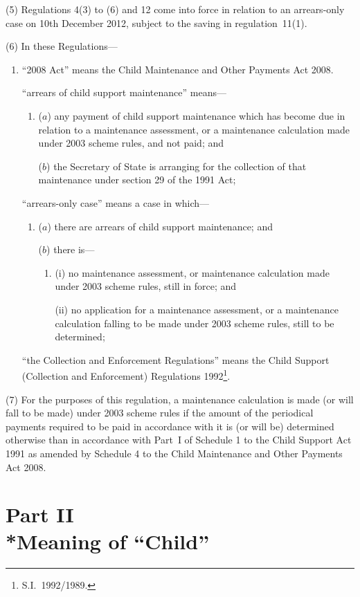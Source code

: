 \documentclass[12pt,a4paper]{article}
\begin{document}
(5) Regulations 4(3) to (6) and 12 come into force in relation to an arrears-only case on 10th December 2012, subject to the saving in regulation~11(1).

(6) In these Regulations—
\begin{enumerate}\item[]
“2008 Act” means the Child Maintenance and Other Payments Act 2008.

“arrears of child support maintenance” means—
\begin{enumerate}\item[]
($a$) 
any payment of child support maintenance which has become due in relation to a maintenance assessment, or a maintenance calculation made under 2003 scheme rules, and not paid; and

($b$) 
the Secretary of State is arranging for the collection of that maintenance under section 29 of the 1991 Act;
\end{enumerate}

“arrears-only case” means a case in which—
\begin{enumerate}\item[]
($a$) 
there are arrears of child support maintenance; and

($b$) 
there is—
\begin{enumerate}\item[]
(i) 
no maintenance assessment, or maintenance calculation made under 2003 scheme rules, still in force; and

(ii) 
no application for a maintenance assessment, or a maintenance calculation falling to be made under 2003 scheme rules, still to be determined;
\end{enumerate}
\end{enumerate}

“the Collection and Enforcement Regulations” means the Child Support (Collection and Enforcement) Regulations 1992\footnote{S.I.~1992/1989.}.
\end{enumerate}

(7) For the purposes of this regulation, a maintenance calculation is made (or will fall to be made) under 2003 scheme rules if the amount of the periodical payments required to be paid in accordance with it is (or will be) determined otherwise than in accordance with Part~I of Schedule 1 to the Child Support Act 1991 as amended by Schedule 4 to the Child Maintenance and Other Payments Act 2008.

\section[Part II --- Meaning of “Child”]{Part II\\*Meaning of “Child”}
\end{document}
